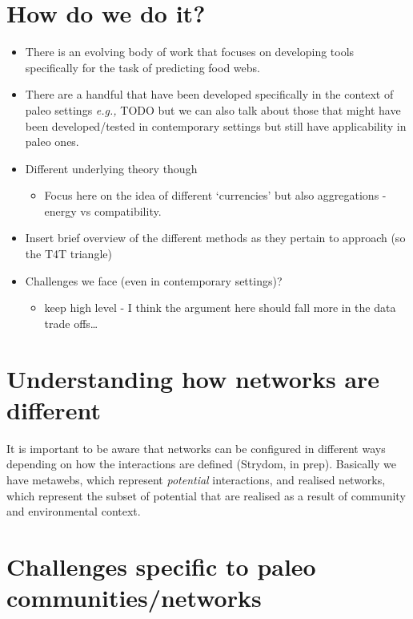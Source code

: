\documentclass[
]{article}
\providecommand{\tightlist}{%
  \setlength{\itemsep}{0pt}\setlength{\parskip}{0pt}}\usepackage{longtable,booktabs,array}
\begin{document}
\section{How do we do it?}\label{how-do-we-do-it}

\begin{itemize}
\item
  There is an evolving body of work that focuses on developing tools
  specifically for the task of predicting food webs.
\item
  There are a handful that have been developed specifically in the
  context of paleo settings \emph{e.g.,} TODO but we can also talk about
  those that might have been developed/tested in contemporary settings
  but still have applicability in paleo ones.
\item
  Different underlying theory though

  \begin{itemize}
  \tightlist
  \item
    Focus here on the idea of different `currencies' but also
    aggregations - energy vs compatibility.
  \end{itemize}
\item
  Insert brief overview of the different methods as they pertain to
  approach (so the T4T triangle)
\item
  Challenges we face (even in contemporary settings)?

  \begin{itemize}
  \tightlist
  \item
    keep high level - I think the argument here should fall more in the
    data trade offs\ldots{}
  \end{itemize}
\end{itemize}

\section{Understanding how networks are
different}\label{understanding-how-networks-are-different}

It is important to be aware that networks can be configured in different
ways depending on how the interactions are defined (Strydom, in prep).
Basically we have metawebs, which represent \emph{potential}
interactions, and realised networks, which represent the subset of
potential that are realised as a result of community and environmental
context.

\section{Challenges specific to paleo
communities/networks}\label{challenges-specific-to-paleo-communitiesnetworks}
\end{document}
